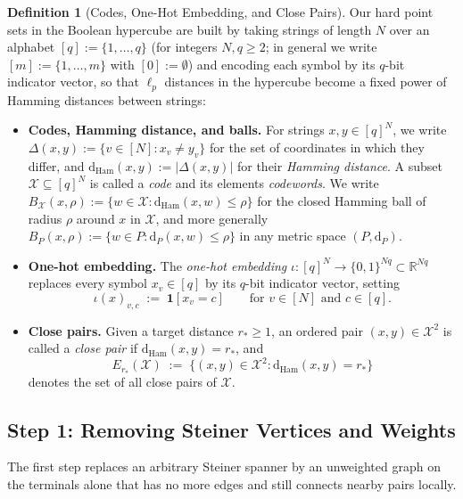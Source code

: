 \documentclass[11pt]{article}
\theoremstyle{definition}
\newtheorem*{definition*}{Definition}
\theoremstyle{remark}
\newcommand{\R}{\mathbb{R}}
\newcommand{\dP}{\mathrm{d}_P}
\newcommand{\Ham}{\mathrm{Ham}}
\newcommand{\dHam}{\mathrm{d}_{\Ham}}
\begin{document}
\begin{definition*}[Codes, One-Hot Embedding, and Close Pairs]
Our hard point sets in the Boolean hypercube are built by taking strings of length $N$ over an alphabet $[q] := \{1, \dots, q\}$ (for integers $N, q \ge 2$; in general we write $[m] := \{1, \dots, m\}$ with $[0] := \emptyset$) and encoding each symbol by its $q$-bit indicator vector, so that $\ell_p$ distances in the hypercube become a fixed power of Hamming distances between strings:
\begin{itemize}[leftmargin=2em,nosep,topsep=4pt,itemsep=3pt]
  \item \textbf{Codes, Hamming distance, and balls.} For strings $x, y \in [q]^N$, we write $\Delta(x, y) := \{v \in [N] : x_v \ne y_v\}$ for the set of coordinates in which they differ, and $\dHam(x, y) := |\Delta(x, y)|$ for their \emph{Hamming distance}. A subset $\mathcal{X} \subseteq [q]^N$ is called a \emph{code} and its elements \emph{codewords}. We write $B_{\mathcal{X}}(x, \rho) := \{w \in \mathcal{X} : \dHam(x, w) \le \rho\}$ for the closed Hamming ball of radius $\rho$ around $x$ in $\mathcal{X}$, and more generally $B_P(x, \rho) := \{w \in P : \dP(x, w) \le \rho\}$ in any metric space $(P, \dP)$.
  \item \textbf{One-hot embedding.} The \emph{one-hot embedding} $\iota : [q]^N \to \{0, 1\}^{N q} \subset \R^{N q}$ replaces every symbol $x_v \in [q]$ by its $q$-bit indicator vector, setting
  \[
  \iota(x)_{v, c} \;:=\; \mathbf{1}[x_v = c] \qquad \text{for } v \in [N] \text{ and } c \in [q].
  \]
  \item \textbf{Close pairs.} Given a target distance $r_* \ge 1$, an ordered pair $(x, y) \in \mathcal{X}^2$ is called a \emph{close pair} if $\dHam(x, y) = r_*$, and
  \[
  E_{r_*}(\mathcal{X}) \;:=\; \{(x, y) \in \mathcal{X}^2 : \dHam(x, y) = r_*\}
  \]
  denotes the set of all close pairs of $\mathcal{X}$.
\end{itemize}
\end{definition*}

\subsection{Step 1: Removing Steiner Vertices and Weights}
\label{subsec:mod1}

The first step replaces an arbitrary Steiner spanner by an unweighted graph on the terminals alone that has no more edges and still connects nearby pairs locally.
\end{document}
